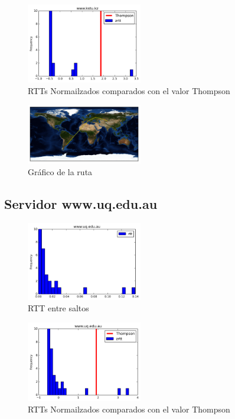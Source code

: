 \begin{figure}[H]
  \centering
    \includegraphics[width=0.45\textwidth]{histogramas_thompson/www-kstu-kz.png}
  \caption{RTTs Normailzados comparados con el valor Thompson}
  \label{entropia-s}
\end{figure}

\begin{figure}[H]
  \centering
    \includegraphics[width=0.45\textwidth]{grafico-rutas/www-kstu-kz.png}
  \caption{Gráfico de la ruta}
  \label{entropia-s}
\end{figure}




\subsection{Servidor www.uq.edu.au}
\begin{figure}[H]
  \centering
    \includegraphics[width=0.45\textwidth]{histogramas_rtt/www-uq-edu-au.png}
  \caption{RTT entre saltos}
  \label{entropia-s}
\end{figure}

\begin{figure}[H]
  \centering
    \includegraphics[width=0.45\textwidth]{histogramas_thompson/www-uq-edu-au.png}
  \caption{RTTs Normailzados comparados con el valor Thompson}
  \label{entropia-s}
\end{figure}

